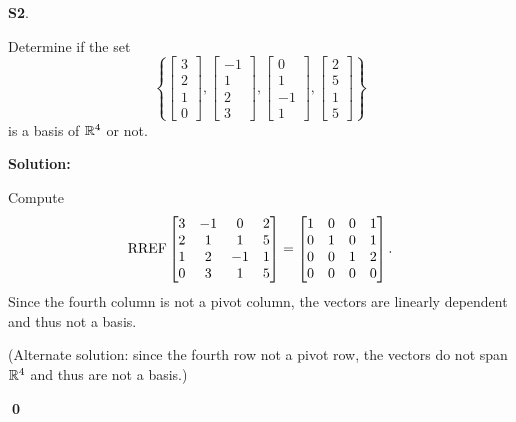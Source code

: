 \documentclass{article}
\newenvironment{problem}[1]
{
  \begin{flushleft}
  \textbf{#1}.
  \ignorespaces
}
{
  \end{flushleft}
}
\newenvironment{solution}
{
  \ignorespaces
  \textbf{Solution:}
}
{
  \ignorespacesafterend
  \begin{flushright}
  {\bfseries \qed}
  \end{flushright}
}
\begin{document}
\begin{problem}{S2}
Determine if the set \[ \left\{
 \begin{bmatrix} 3 \\ 2 \\ 1 \\ 0 \end{bmatrix} ,
 \begin{bmatrix} -1 \\ 1 \\ 2 \\ 3 \end{bmatrix} ,
 \begin{bmatrix} 0 \\ 1 \\ -1 \\ 1 \end{bmatrix} ,
 \begin{bmatrix} 2 \\ 5 \\ 1 \\ 5 \end{bmatrix} \right\} \]
is a basis of $\mathbb{R}^4$ or not.
\end{problem}
\begin{solution}
Compute
\[\operatorname{RREF} \begin{bmatrix} 3 & -1 & 0 & 2 \\ 2 & 1 & 1 & 5 \\ 1 & 2 & -1 & 1 \\ 0 & 3 & 1 & 5 \end{bmatrix} =
\begin{bmatrix} 1 & 0 & 0 & 1 \\ 0 & 1 & 0 & 1 \\ 0 & 0 & 1 & 2 \\ 0 & 0 & 0 & 0 \end{bmatrix}.\]
Since the fourth column is not a pivot column, the vectors are linearly
dependent and thus not a basis.

(Alternate solution:
since the fourth row not a pivot row, the vectors do not span
\(\mathbb{R}^4\) and thus are not a basis.)
\end{solution}
\end{document}
